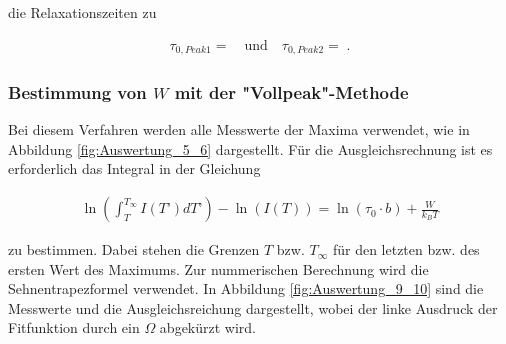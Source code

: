 die Relaxationszeiten zu

\begin{align}
	\tau_{0,Peak1} =   \quad \text{und} \quad \tau_{0,Peak2} = \;.
\end{align}



\subsubsection{Bestimmung von $W$ mit der "Vollpeak"-Methode}

Bei diesem Verfahren werden alle Messwerte der Maxima verwendet, wie in Abbildung \ref{fig:Auswertung_5_6} dargestellt. Für die Ausgleichsrechnung ist es erforderlich das Integral in der Gleichung

\begin{align}
	\ln(\int_{T}^{T_{\infty}} I(T’) dT’) - \ln(I(T))=\ln(\tau_0\cdot b) + \frac{W}{k_B T}
	\label{eq:auswertung_integral}
\end{align}

zu bestimmen. Dabei stehen die Grenzen $T$ bzw. $T_{\infty}$ für den letzten bzw. des ersten Wert des Maximums. Zur nummerischen Berechnung wird die Sehnentrapezformel verwendet. In Abbildung \ref{fig:Auswertung_9_10} sind die Messwerte und die Ausgleichsreichung dargestellt, wobei der linke Ausdruck der Fitfunktion durch ein $\Omega$ abgekürzt wird.


